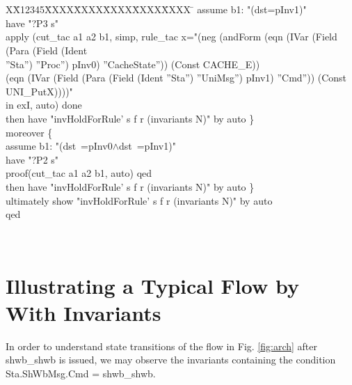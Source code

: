 \documentclass{llncs}
\newlength{\fminilength}
\newenvironment{fmini}[1][\linewidth]
  {\setlength{\fminilength}{#1\fboxsep-2\fboxrule}%
   \vspace{2ex}\noindent\begin{lrbox}{\fminibox}\begin{minipage}{\fminilength}%
   \mbox{ }\hfill\vspace{-2.5ex}}%
  {\end{minipage}\end{lrbox}\vspace{1ex}\hspace{0ex}%
   \framebox{\usebox{\fminibox}}}
\newenvironment{specification}
{\noindent\scriptsize
\tt\begin{fmini}\begin{tabbing}X\=X12345\=XXXX\=XXXX\=XXXX\=XXXX\=XXXX
\=\+\kill} {\end{tabbing}\normalfont\end{fmini}}
\def \twoSpaces {\ \ }
\def \twoSpaces {\ \ }
\begin{document}
\begin{specification}
  assume b1: "(dst=pInv1)"\\
  have "?P3 s"\\
  apply (cut\_tac a1 a2 b1, simp, rule\_tac x="(neg (andForm (eqn (IVar (Field (Para (Field (Ident\\
   ''Sta'') ''Proc'') pInv0) ''CacheState''))    (Const CACHE\_E)) \\
   (eqn (IVar (Field (Para (Field (Ident ''Sta'') ''UniMsg'') pInv1) ''Cmd'')) (Const UNI\_PutX))))" \\
   in exI, auto) done\\
  then have "invHoldForRule' s f r (invariants N)" by auto
\}\\
moreover \{\\
  assume b1: "(dst~=pInv0$\wedge$dst~=pInv1)"\\
  have "?P2 s"\\
  proof(cut\_tac a1 a2 b1, auto) qed\\
  then have "invHoldForRule' s f r (invariants N)" by auto
\}\\
ultimately show "invHoldForRule' s f r (invariants N)" by auto \twoSpaces \\ qed\\

\end{specification}\\


\vspace{-10pt}
\section{Illustrating a Typical Flow by With Invariants\label{sec:relatingWithFlow}}


In order to understand state transitions of the flow in Fig. \ref{fig:arch} after shwb\_shwb is issued, we may observe the invariants containing the condition Sta.ShWbMsg.Cmd = shwb\_shwb.
\end{document}
